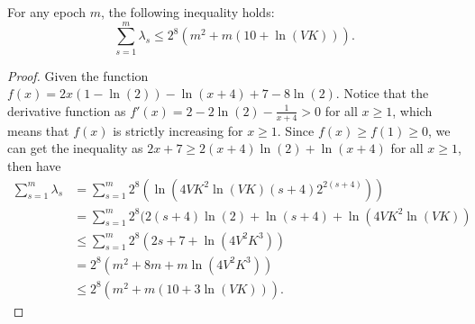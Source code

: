 \begin{lemma}
\label{lem:tslm}     %
    For any epoch $m$, the following inequality holds:
    \[\sum_{s=1}^{m} \lambda_s \leq 2^8(m^2 + m(10+\ln(VK))).\]
\end{lemma}
\begin{proof}
    Given the function $f(x) = 2x(1-\ln(2)) - \ln(x+4) + 7 - 8\ln(2)$. Notice that the derivative function as $f'(x) = 2 - 2\ln(2) - \frac{1}{x+4} > 0$ for all $x \geq 1$, which means that $f(x)$ is strictly increasing for $x \geq 1$. Since $f(x) \geq f(1) \geq 0$, we can get the inequality as $2x + 7 \geq 2(x+4)\ln(2) + \ln(x+4)$ for all $x \geq 1$, then have
    \begin{align*}
        \sum_{s=1}^{m} \lambda_s &= \sum_{s=1}^{m} 2^8(\ln(4VK^2\ln(VK)(s+4)2^{2(s+4)})) \\
        &= \sum_{s=1}^{m} 2^8(2(s+4)\ln(2) + \ln(s+4) + \ln(4VK^2\ln(VK)) \\
        &\leq \sum_{s=1}^{m} 2^8(2s + 7 + \ln(4V^2K^3)) \\
        &= 2^8(m^2 + 8m + m\ln(4V^2K^3)) \\
        &\leq 2^8(m^2 + m(10+3\ln(VK))).
    \end{align*}
\end{proof}

